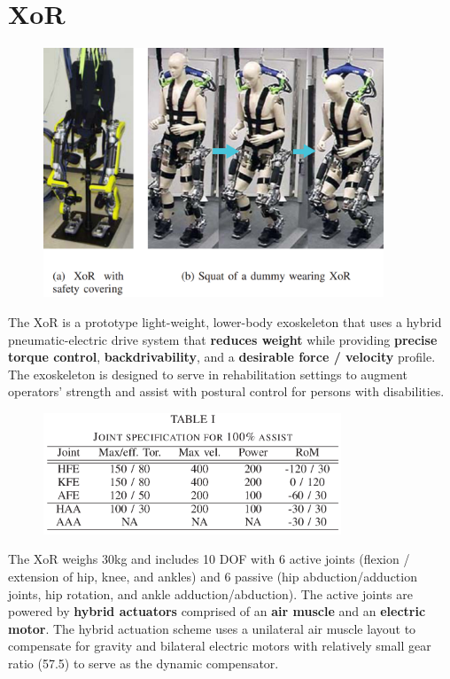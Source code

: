 \section{XoR}
\label{exo:XoR}
\begin{refsection}


\begin{figure}[ht]
  \centering
  \includegraphics[width=4.0in]{exos/figs/xor.png}
\end{figure}

The XoR is a prototype light-weight, lower-body exoskeleton that uses a hybrid pneumatic-electric drive system that \textbf{reduces weight} while providing \textbf{precise torque control}, \textbf{backdrivability}, and a \textbf{desirable force / velocity} profile.  The exoskeleton is designed to serve in rehabilitation settings to augment operators' strength and assist with postural control for persons with disabilities.

\begin{figure}[ht]
  \centering
  \includegraphics[width=3.5in]{exos/figs/xor_joint_rom.png}
\end{figure}

The XoR weighs 30kg and includes 10 DOF with 6 active joints (flexion / extension of hip, knee, and ankles) and 6 passive (hip abduction/adduction joints, hip rotation, and ankle adduction/abduction).  The active joints are powered by \textbf{hybrid actuators} comprised of an \textbf{air muscle} and an \textbf{electric motor}.  The hybrid actuation scheme uses a unilateral air muscle layout to compensate for gravity and bilateral electric motors with relatively small gear ratio (57.5) to serve as the dynamic compensator.


\end{refsection}
